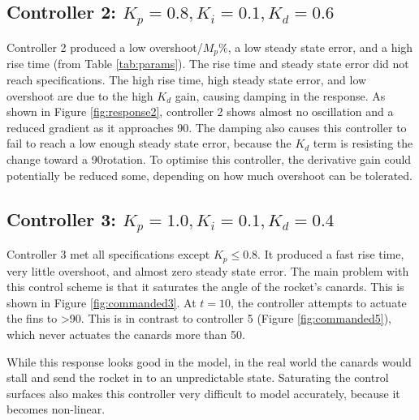 \documentclass[12pt]{article}
\begin{document}
\subsection{Controller 2: $K_p = 0.8, K_i = 0.1, K_d = 0.6$}
Controller 2 produced a low overshoot/$M_p\%$, a low steady state error, and a high rise time (from Table \ref{tab:params}). The rise time and steady state error did not reach specifications. The high rise time, high steady state error, and low overshoot are due to the high $K_d$ gain, causing damping in the response. As shown in Figure \ref{fig:response2}, controller 2 shows almost no oscillation and a reduced gradient as it approaches 90\degree. The damping also causes this controller to fail to reach a low enough steady state error, because the $K_d$ term is resisting the change toward a 90\degree rotation. To optimise this controller, the derivative gain could potentially be reduced some, depending on how much overshoot can be tolerated.


\subsection{Controller 3: $K_p = 1.0, K_i = 0.1, K_d = 0.4$}
Controller 3 met all specifications except $K_p \leq 0.8$. It produced a fast rise time, very little overshoot, and almost zero steady state error. The main problem with this control scheme is that it saturates the angle of the rocket's canards. This is shown in Figure \ref{fig:commanded3}. At $t=10$, the controller attempts to actuate the fins to >90\degree. This is in contrast to controller 5 (Figure \ref{fig:commanded5}), which never actuates the canards more than 50\degree.

While this response looks good in the model, in the real world the canards would stall and send the rocket in to an unpredictable state. Saturating the control surfaces also makes this controller very difficult to model accurately, because it becomes non-linear.
\end{document}
